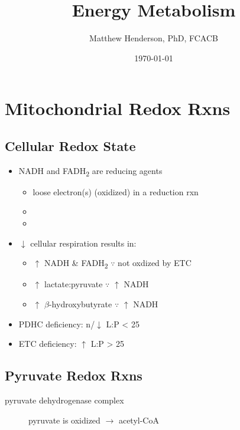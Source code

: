 \documentclass{scrartcl}
\author{Matthew Henderson, PhD, FCACB}
\date{\today}
\title{Energy Metabolism}
\begin{document}
\maketitle
\setcounter{tocdepth}{2}
\tableofcontents


\section{Mitochondrial Redox Rxns}
\label{sec:orgd2eb640}
\subsection{Cellular Redox State}
\label{sec:org4506d61}
\begin{itemize}
\item NADH and FADH\textsubscript{2} are reducing agents
\begin{itemize}
\item loose electron(s) (oxidized) in a reduction rxn
\item {}
\item {}
\end{itemize}
\item \(\downarrow\) cellular respiration results in:
\begin{itemize}
\item \(\uparrow\) NADH \& FADH\textsubscript{2} \(\because\) not oxdized by ETC
\item \(\uparrow\) lactate:pyruvate \(\because\) \(\uparrow\) NADH
\item \(\uparrow\) \(\beta\)-hydroxybutyrate  \(\because\) \(\uparrow\) NADH
\end{itemize}

\item PDHC deficiency: n/\(\downarrow\) L:P < 25
\item ETC deficiency: \(\uparrow\) L:P > 25
\end{itemize}

\subsection{Pyruvate Redox Rxns}
\label{sec:org5e5732a}

\begin{description}
\item[{pyruvate dehydrogenase complex}] pyruvate is oxidized \(\to\) acetyl-CoA
\end{description}

\end{document}
